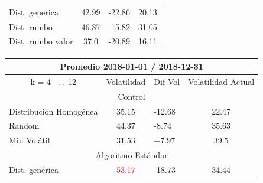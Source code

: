 \documentclass[12pt,a4paper]{article}
\begin{document}
\begin{table}[H]
\begin{tabular}{l|c|l|c|}
\hline
\rowcolor[rgb]{0.925,0.957,1} Dist. generica                           & 42.99                            & \textcolor[rgb]{0,0.502,0}{-22.86} & 20.13                              \\
\rowcolor[rgb]{0.855,0.91,0.988} Dist. rumbo                           & 46.87                            & -15.82                             & 31.05                              \\
\rowcolor[rgb]{0.925,0.957,1} Dist. rumbo valor                        & \textcolor[rgb]{0,0.502,0}{37.0} & -20.89                             & \textcolor[rgb]{0,0.502,0}{16.11} 
\end{tabular}
\end{table}
	
\begin{table}[H]
\centering
\begin{tabular}{l|c|l|c|} 
\hline
\multicolumn{4}{c}{{\cellcolor[rgb]{0.635,0.647,0.788}}Promedio 2018-01-01 / 2018-12-31}                                                                                             \\ 
\hline
\multicolumn{1}{c|}{{\cellcolor[rgb]{0.635,0.647,0.788}}k = 4~ . . 12} & Volatilidad                       & Dif Vol                            & Volatilidad Actual                 \\ 
\hline
\multicolumn{4}{c}{{\cellcolor[rgb]{0.796,0.808,0.984}}Control}                                                                                                                      \\ 
\hline
\rowcolor[rgb]{0.925,0.957,1} Distribución Homogénea                   & 35.15                             & -12.68                             & 22.47                              \\
\rowcolor[rgb]{0.855,0.91,0.988} Random                                & 44.37                             & -8.74                              & 35.63                              \\
\rowcolor[rgb]{0.925,0.957,1} Min Volátil                              & 31.53                             & +7.97                              & 39.5                               \\ 
\hline
\multicolumn{4}{c}{{\cellcolor[rgb]{0.796,0.808,0.984}}Algoritmo Estándar}                                                                                                           \\ 
\hline
\rowcolor[rgb]{0.925,0.957,1} Dist. genérica                           & \textcolor{red}{53.17}            & \textcolor[rgb]{0,0.502,0}{-18.73} & \textcolor[rgb]{0,0.502,0}{34.44}  \\

\end{tabular}
\end{table}
\end{document}
